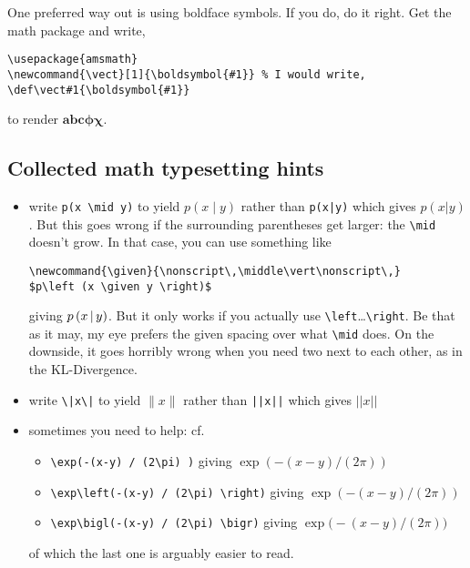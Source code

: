 \documentclass{article}
\begin{document}
One preferred way out is using boldface symbols.  If you do, do it right.  Get the \AmS math package and write,
\begin{verbatim}
\usepackage{amsmath}
\newcommand{\vect}[1]{\boldsymbol{#1}} % I would write, \def\vect#1{\boldsymbol{#1}}
\end{verbatim}
to render $\boldsymbol{abc\phi\chi}$.

\subsection{Collected math typesetting hints}
\begin{itemize}
\item write \verb$p(x \mid y)$ to yield $p(x \mid y)$ rather than \verb$p(x|y)$ which gives $p(x|y)$.  But this goes wrong if the surrounding parentheses get larger: the \verb|\mid| doesn't grow.  In that case, you can use something like
\begin{verbatim}
\newcommand{\given}{\nonscript\,\middle\vert\nonscript\,}
$p\left (x \given y \right)$
\end{verbatim}
giving
\newcommand{\given}{\nonscript\,\middle\vert\nonscript\,}
$p\left (x \given y \right)$.
But it only works if you actually use \verb|\left|\dots\!\verb|\right|.
Be that as it may, my eye prefers the given spacing over what \verb|\mid| does.
On the downside, it goes horribly wrong when you need two next to each other, as in the KL-Divergence.

\item write \verb$\|x\|$ to yield $\|x\|$ rather than \verb$||x||$ which gives $||x||$
\item sometimes you need to help: cf.\ \begin{itemize}
\item\verb$\exp(-(x-y) / (2\pi) )$ giving $\exp(-(x-y) / (2\pi) )$
\item\verb$\exp\left(-(x-y) / (2\pi) \right)$ giving $\exp\left(-(x-y) / (2\pi) \right)$
\item \verb$\exp\bigl(-(x-y) / (2\pi) \bigr)$ giving $\exp\bigl(-(x-y) / (2\pi) \bigr)$
\end{itemize}
of which the last one is arguably easier to read.
\end{itemize}



 
\end{document}
